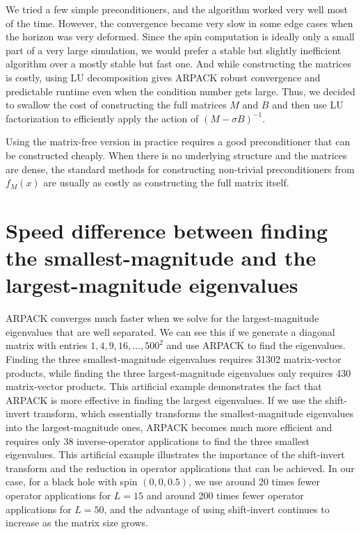 \documentclass{iopjournal}
\begin{document}
We tried a few simple preconditioners, and the algorithm worked very well most of the time. However, the convergence became very slow in some edge cases when the horizon was very deformed. Since the spin computation is ideally only a small part of a very large simulation, we would prefer a stable but slightly inefficient algorithm over a mostly stable but fast one. And while constructing the matrices is costly, using LU decomposition gives ARPACK robust convergence and predictable runtime even when the condition number gets large. Thus, we decided to swallow the cost of constructing the full matrices $M$ and $B$ and then use LU factorization to efficiently apply the action of $(M- \sigma B)^{-1}$.

Using the matrix-free version in practice requires a good preconditioner that can be constructed cheaply. When there is no underlying structure and the matrices are dense, the standard methods for constructing non-trivial preconditioners from $f_{M}(x)$ are usually as costly as constructing the full matrix itself.


\section{\label{sec:Speed difference between finding the smallest and the largest eigenvalues} Speed difference between finding the smallest-magnitude and the largest-magnitude eigenvalues}

ARPACK converges much faster when we solve for the largest-magnitude eigenvalues that are well separated. We can see this if we generate a diagonal matrix with entries $1,4,9,16, \ldots, 500^2$ and use ARPACK to find the eigenvalues. Finding the three smallest-magnitude eigenvalues requires 31302 matrix-vector products, while finding the three largest-magnitude eigenvalues only requires 430 matrix-vector products. This artificial example demonstrates the fact that ARPACK is more effective in finding the largest eigenvalues. If we use the shift-invert transform, which essentially transforms the smallest-magnitude eigenvalues into the largest-magnitude ones, ARPACK becomes much more efficient and requires only 38 inverse-operator applications to find the three smallest eigenvalues. This artificial example illustrates the importance of the shift-invert transform and the reduction in operator applications that can be achieved. In our case, for a black hole with spin $(0,0,0.5)$, we use around 20 times fewer operator applications for $L=15$ and around 200 times fewer operator applications for $L=50$, and the advantage of using shift-invert continues to increase as the matrix size grows.


\clearpage


\end{document}
